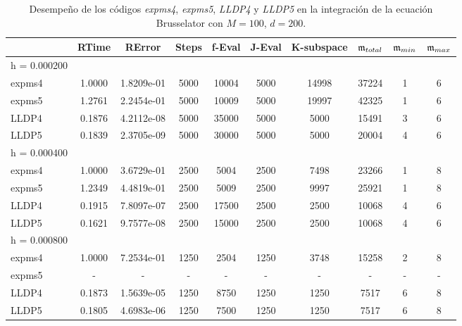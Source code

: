 \begin{table}[htb]
	\caption{Desempeño de los códigos \emph{expms4}, \emph{expms5}, \emph{LLDP4} y \emph{LLDP5} en la integración de la ecuación Brusselator con $M=100$, $d=200$.}
	\centering
	\begin{tabular}{lccccccccc}
		\hline
		& RTime & RError & Steps & f-Eval & J-Eval & K-subspace & $\mathfrak{m}_{total}$ & $\mathfrak{m}_{min}$ & $\mathfrak{m}_{max}$ \\
		\hline
		h = 0.000200 &  &  &  &  &  &  &  &  &  \\
		expms4 & 1.0000 & 1.8209e-01 & 5000 & 10004 & 5000 & 14998 & 37224 & 1 & 6  \\
		expms5 & 1.2761 & 2.2454e-01 & 5000 & 10009 & 5000 & 19997 & 42325 & 1 & 6  \\
		LLDP4 & 0.1876 & 4.2112e-08 & 5000 & 35000 & 5000 & 5000 & 15491 & 3 & 6  \\
		LLDP5 & 0.1839 & 2.3705e-09 & 5000 & 30000 & 5000 & 5000 & 20004 & 4 & 6  \\
		\hline
		h = 0.000400 &  &  &  &  &  &  &  &  &  \\
		expms4 & 1.0000 & 3.6729e-01 & 2500 & 5004 & 2500 & 7498 & 23266 & 1 & 8  \\
		expms5 & 1.2349 & 4.4819e-01 & 2500 & 5009 & 2500 & 9997 & 25921 & 1 & 8  \\
		LLDP4 & 0.1915 & 7.8097e-07 & 2500 & 17500 & 2500 & 2500 & 10068 & 4 & 6  \\
		LLDP5 & 0.1621 & 9.7577e-08 & 2500 & 15000 & 2500 & 2500 & 10068 & 4 & 6  \\
		\hline
		h = 0.000800 &  &  &  &  &  &  &  &  &  \\
		expms4 & 1.0000 & 7.2534e-01 & 1250 & 2504 & 1250 & 3748 & 15258 & 2 & 8  \\
		expms5 & - & - & - & - & - & - &- & - & -\\
		LLDP4 & 0.1873 & 1.5639e-05 & 1250 & 8750 & 1250 & 1250 & 7517 & 6 & 8  \\
		LLDP5 & 0.1805 & 4.6983e-06 & 1250 & 7500 & 1250 & 1250 & 7517 & 6 & 8  \\
		\hline
	\end{tabular}
	\label{tab:num-exp-lldp-fix-step:brna}
\end{table}

